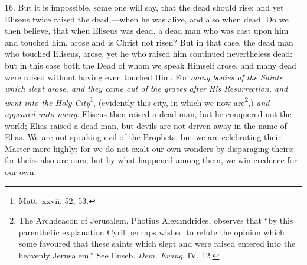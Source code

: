 16. But it is impossible, some one will say, that the dead should rise; and yet Eliseus twice raised the dead,—when he was alive, and also when dead. Do we then believe, that when Eliseus was dead, a dead man who was cast upon him and touched him, arose and is Christ not risen? But in that case, the dead man who touched Eliseus, arose, yet he who raised him continued nevertheless dead: but in this case both the Dead of whom we speak Himself arose, and many dead were raised without having even touched Him. For \emph{many bodies of the Saints which slept arose, and they came out of the graves after His Resurrection, and went into the Holy City}\footnote{Matt. xxvii. 52, 53.}, (evidently this city, in which we now are\footnote{The Archdeacon of Jerusalem, Photius Alexandrides, observes that “by this parenthetic explanation Cyril perhaps wished to refute the opinion which some favoured that these saints which slept and were raised entered into the heavenly Jerusalem.” See Euseb. \emph{Dem. Evang}. IV. 12.},) \emph{and appeared unto many}. Eliseus then raised a dead man, but he conquered not the world; Elias raised a dead man, but devils are not driven away in the name of Elias. We are not speaking evil of the Prophets, but we are celebrating their Master more highly; for we do not exalt our own wonders by disparaging theirs; for theirs also are ours; but by what happened among them, we win credence for our own.

